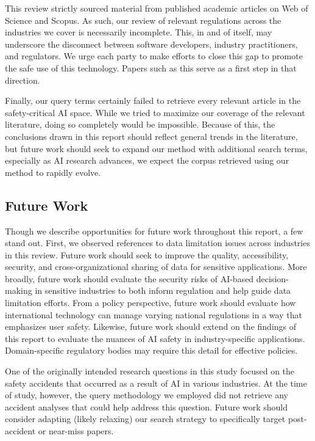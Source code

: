 \documentclass[authoryear,preprint,12pt]{elsarticle}
\begin{document}
This review strictly sourced material from published academic articles on Web of
Science and Scopus. As such, our review of relevant regulations across the
industries we cover is necessarily incomplete. This, in and of itself, may
underscore the disconnect between software developers, industry practitioners,
and regulators. We urge each party to make efforts to close this gap to promote
the safe use of this technology. Papers such as this serve as a first step in
that direction.

Finally, our query terms certainly failed to retrieve every relevant article in
the safety-critical AI space. While we tried to maximize our coverage of the
relevant literature, doing so completely would be impossible. Because of this,
the conclusions drawn in this report should reflect general trends in the
literature, but future work should seek to expand our method with additional
search terms, especially as AI research advances, we expect the corpus retrieved
using our method to rapidly evolve.

\subsection{Future Work}
\label{sec:futurework}
Though we describe opportunities for future work throughout this report, a few
stand out. First, we observed references to data limitation issues across
industries in this review. Future work should seek to improve the quality,
accessibility, security, and cross-organizational sharing of data for sensitive
applications. More broadly, future work should evaluate the security risks of
AI-based decision-making in sensitive industries to both inform regulation and
help guide data limitation efforts. From a policy perspective, future work
should evaluate how international technology can manage varying national
regulations in a way that emphasizes user safety. Likewise, future work should
extend on the findings of this report to evaluate the nuances of AI safety in
industry-specific applications. Domain-specific regulatory bodies may require
this detail for effective policies. 

One of the originally intended research questions in this study focused on
the safety accidents that occurred as a result of AI in various industries. At
the time of study, however, the query methodology we employed did not retrieve
any accident analyses that could help address this question. Future work should
consider adapting (likely relaxing) our search strategy to specifically target
post-accident or near-miss papers. 
\end{document}

